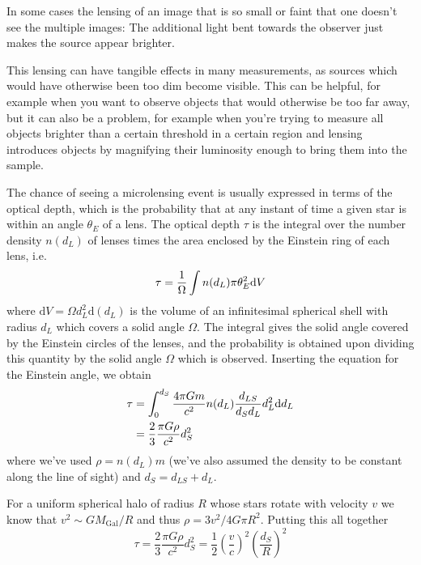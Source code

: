 \par In some cases the lensing of an image that is so small or faint that one doesn't see the multiple images: The additional light bent towards the observer just makes the source appear brighter.
\par This lensing can have tangible effects in many measurements, as sources which would have otherwise been too dim become visible. This can be helpful, for example when you want to observe objects that would otherwise be too far away, but it can also be a problem, for example when you're trying to measure all objects brighter than a certain threshold in a certain region and lensing introduces objects by magnifying their luminosity enough to bring them into the sample.
\par The chance of seeing a microlensing event is usually expressed in terms of the optical depth, which is the probability that at any instant of time a given star is within an angle $\theta_{E}$ of a lens. The optical depth $\tau$ is the integral over the number density $n(d_{L})$ of lenses times the area enclosed by the Einstein ring of each lens, i.e.
\begin{equation*}
    \tau = \frac{1}{\Omega}\int n(d_{L})\pi\theta_{E}^{2}\text{d}V
\end{equation*}
where $\text{d}V = \Omega d_{L}^{2}\text{d}(d_{L})$ is the volume of an infinitesimal spherical shell with radius $d_{L}$ which covers a solid angle $\Omega$. The integral gives the solid angle covered by the Einstein circles of the lenses, and the probability is obtained upon dividing this quantity by the solid angle $\Omega$ which is observed. Inserting the equation for the Einstein angle, we obtain
\begin{align*}
    \tau &= \int_{0}^{d_{S}} \frac{4\pi Gm}{c^{2}}n(d_{L})\frac{d_{LS}}{d_{S}d_{L}}d_{L}^{2}\text{d}d_{L}\\
    & = \frac{2}{3}\frac{\pi G \rho}{c^{2}}d_{S}^{2}
\end{align*}
where we've used $\rho = n(d_{L})m$ (we've also assumed the density to be constant along the line of sight) and $d_{S} = d_{LS}+d_{L}$.
\par For a uniform spherical halo of radius $R$ whose stars rotate with velocity $v$ we know that $v^{2}\sim GM_{\text{Gal}}/R$ and thus $\rho = 3v^{2}/4G\pi R^{2}$. Putting this all together
\begin{equation}
    \tau =  \frac{2}{3}\frac{\pi G \rho}{c^{2}}d_{S}^{2} = \frac{1}{2}\left(\frac{v}{c}\right)^{2}\left(\frac{d_{S}}{R}\right)^{2}
\end{equation}
